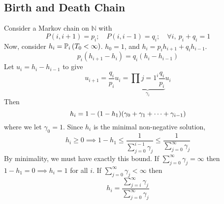 \subsection{Birth and Death Chain}
Consider a Markov chain on \( \mathbb N \) with
\[
	P(i,i+1) = p_i;\quad P(i,i-1) = q_i;\quad \forall i,\ p_i + q_i = 1
\]
Now, consider \( h_i = \mathbb{P}_{i}\left({T_0 < \infty}\right) \).
\( h_0 = 1 \), and \( h_i = p_i h_{i+1} + q_i h_{i-1} \).
\[
	p_i (h_{i+1} - h_i) = q_i (h_i - h_{i-1})
\]
Let \( u_i = h_i - h_{i-1} \) to give
\[
	u_{i+1} = \frac{q_i}{p_i} u_i = \underbrace{\prod{j=1}^i \frac{q_i}{p_i}}_{\gamma_i} u_i
\]
Then
\[
	h_i = 1 - (1 - h_1) \qty( \gamma_0 + \gamma_1 + \dots + \gamma_{i-1} )
\]
where we let \( \gamma_0 = 1 \).
Since \( h_i \) is the minimal non-negative solution,
\[
	h_i \geq 0 \implies 1 - h_1 \leq \frac{1}{\sum_{j=0}^{i-1} \gamma_j} \leq \frac{1}{\sum_{j=0}^{\infty} \gamma_j}
\]
By minimality, we must have exactly this bound.
If \( \sum_{j=0}^\infty \gamma_j = \infty \) then \( 1 - h_1 = 0 \implies h_i = 1 \) for all \( i \).
If \( \sum_{j=0}^\infty \gamma_j < \infty \) then
\[
	h_i = \frac{\sum_{j=i}^\infty \gamma_j}{\sum_{j=0}^\infty \gamma_j}
\]

